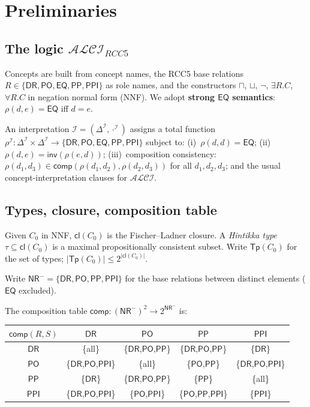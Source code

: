 \documentclass[a4paper,11pt]{article}
\theoremstyle{definition}
\newcommand{\ALCI}{\ensuremath{\mathcal{ALCI}}}
\newcommand{\ALCIRCC}[1]{\ensuremath{\mathcal{ALCI}_{\mathit{RCC#1}}}}
\newcommand{\DR}{\ensuremath{\mathsf{DR}}}
\newcommand{\PO}{\ensuremath{\mathsf{PO}}}
\newcommand{\EQ}{\ensuremath{\mathsf{EQ}}}
\newcommand{\PP}{\ensuremath{\mathsf{PP}}}
\newcommand{\PPI}{\ensuremath{\mathsf{PPI}}}
\newcommand{\inv}{\ensuremath{\mathsf{inv}}}
\newcommand{\comp}{\ensuremath{\mathsf{comp}}}
\newcommand{\cl}{\ensuremath{\mathsf{cl}}}
\newcommand{\Tp}{\ensuremath{\mathsf{Tp}}}
\newcommand{\NR}{\ensuremath{\mathsf{NR}}}
\newcommand{\interp}{\ensuremath{\mathcal{I}}}
\newcommand{\DeltaI}{\ensuremath{\Delta^{\mathcal{I}}}}
\begin{document}
\section{Preliminaries}\label{sec:prelim}

\subsection{The logic $\ALCIRCC{5}$}

Concepts are built from concept names, the RCC5 base relations
$R \in \{\DR, \PO, \EQ, \PP, \PPI\}$ as role names, and the
constructors $\sqcap$, $\sqcup$, $\neg$, $\exists R.C$,
$\forall R.C$ in negation normal form (NNF).  We adopt
\textbf{strong $\EQ$ semantics}: $\rho(d, e) = \EQ$ iff
$d = e$.

An interpretation $\interp = (\DeltaI, \cdot^{\interp})$
assigns a total function
$\rho^{\interp}: \DeltaI \times \DeltaI \to
\{\DR, \PO, \EQ, \PP, \PPI\}$ subject to: (i)~$\rho(d,d) = \EQ$;
(ii)~$\rho(d,e) = \inv(\rho(e,d))$;
(iii)~composition consistency:
$\rho(d_1, d_3) \in \comp(\rho(d_1, d_2), \rho(d_2, d_3))$
for all $d_1, d_2, d_3$; and the usual concept-interpretation
clauses for $\ALCI$.

\subsection{Types, closure, composition table}

Given $C_0$ in NNF, $\cl(C_0)$ is the Fischer--Ladner closure.
A \emph{Hintikka type} $\tau \subseteq \cl(C_0)$ is a maximal
propositionally consistent subset.  Write $\Tp(C_0)$ for the
set of types; $|\Tp(C_0)| \le 2^{|\cl(C_0)|}$.

Write $\NR^{-} = \{\DR, \PO, \PP, \PPI\}$ for the base
relations between distinct elements ($\EQ$ excluded).

The composition table
$\comp: (\NR^{-})^2 \to 2^{\NR^{-}}$ is:

\begin{center}
\renewcommand{\arraystretch}{1.15}
\begin{tabular}{c|cccc}
$\comp(R, S)$ & $\DR$ & $\PO$ & $\PP$ & $\PPI$ \\
\hline
$\DR$ & \{all\} & \{$\DR$,$\PO$,$\PP$\} &
  \{$\DR$,$\PO$,$\PP$\} & \{$\DR$\} \\
$\PO$ & \{$\DR$,$\PO$,$\PPI$\} & \{all\} &
  \{$\PO$,$\PP$\} & \{$\DR$,$\PO$,$\PPI$\} \\
$\PP$ & \{$\DR$\} & \{$\DR$,$\PO$,$\PP$\} &
  \{$\PP$\} & \{all\} \\
$\PPI$ & \{$\DR$,$\PO$,$\PPI$\} & \{$\PO$,$\PPI$\} &
  \{$\PO$,$\PP$,$\PPI$\} & \{$\PPI$\} \\
\end{tabular}
\end{center}
\end{document}
